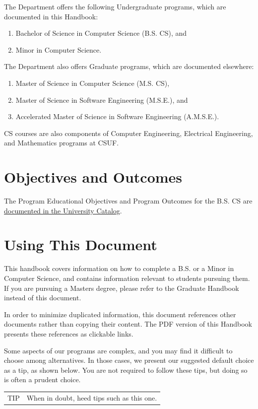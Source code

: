 \documentclass{book}
\newcommand{\campusname}{CSUF}
\newenvironment{tip}{
  \tcolorbox \begin{tabular}{m{.5in} m{5in}} \Large{TIP} &
}{
  \end{tabular} \endtcolorbox
}
\begin{document}
The Department offers the following Undergraduate programs, which are documented in this Handbook:
\begin{enumerate}
\item Bachelor of Science in Computer Science (B.S. CS), and
\item Minor in Computer Science.
\end{enumerate}

The Department also offers Graduate programs, which are documented elsewhere:
\begin{enumerate}
\item Master of Science in Computer Science (M.S. CS),
\item Master of Science in Software Engineering (M.S.E.), and
\item Accelerated Master of Science in Software Engineering (A.M.S.E.).
\end{enumerate}

CS courses are also components of Computer Engineering, Electrical Engineering, and Mathematics programs at \campusname.

\section{Objectives and Outcomes}
 
The Program Educational Objectives and Program Outcomes for the B.S. CS are \href{http://catalog.fullerton.edu/preview_entity.php?catoid=2&ent_oid=113&returnto=137#Learning_Goals_and_Student_Learning_Outcomes}{documented in the University Catalog}.

\section{Using This Document}

This handbook covers information on how to complete a B.S. or a Minor in Computer Science, and contains information relevant to students pursuing them. If you are pursuing a Masters degree, please refer to the Graduate Handbook instead of this document.

In order to minimize duplicated information, this document references other documents rather than copying their content. The PDF version of this Handbook presents these references as clickable links.

Some aspects of our programs are complex, and you may find it difficult to choose among alternatives. In those cases, we present our suggested default choice as a tip, as shown below. You are not required to follow these tips, but doing so is often a prudent choice.
\begin{tip}
When in doubt, heed tips such as this one.
\end{tip}
\end{document}
